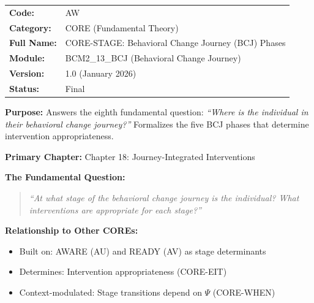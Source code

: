 %
%
%

\begin{tcolorbox}[colback=gray!5!white, colframe=gray!75!black,
    title=Appendix Header: AW CORE-STAGE]

\begin{tabular}{@{}ll@{}}
\textbf{Code:} & AW \\
\textbf{Category:} & CORE (Fundamental Theory) \\
\textbf{Full Name:} & CORE-STAGE: Behavioral Change Journey (BCJ) Phases \\
\textbf{Module:} & BCM2\_13\_BCJ (Behavioral Change Journey) \\
\textbf{Version:} & 1.0 (January 2026) \\
\textbf{Status:} & Final \\
\end{tabular}

\vspace{0.5em}
\textbf{Purpose:} Answers the eighth fundamental question:
\textit{``Where is the individual in their behavioral change journey?''}
Formalizes the five BCJ phases that determine intervention appropriateness.

\end{tcolorbox}

\begin{tcolorbox}[colback=purple!5!white, colframe=purple!75!black,
    title=Chapter Linkage]

\textbf{Primary Chapter:} Chapter 18: Journey-Integrated Interventions

\textbf{The Fundamental Question:}
\begin{quote}
\textit{``At what stage of the behavioral change journey is the individual?
What interventions are appropriate for each stage?''}
\end{quote}

\textbf{Relationship to Other COREs:}
\begin{itemize}[nosep]
\item Built on: AWARE (AU) and READY (AV) as stage determinants
\item Determines: Intervention appropriateness (CORE-EIT)
\item Context-modulated: Stage transitions depend on $\Psi$ (CORE-WHEN)
\end{itemize}

\end{tcolorbox}

